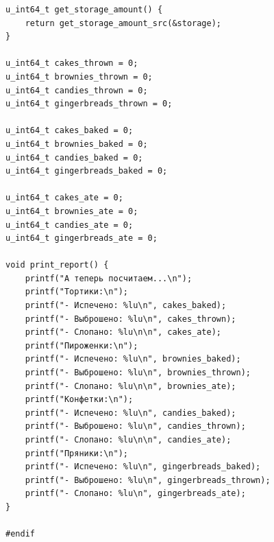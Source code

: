 \documentclass[a4paper,14pt]{extarticle}
\begin{document}
\begin{verbatim}
u_int64_t get_storage_amount() {
    return get_storage_amount_src(&storage);
}

u_int64_t cakes_thrown = 0;
u_int64_t brownies_thrown = 0;
u_int64_t candies_thrown = 0;
u_int64_t gingerbreads_thrown = 0;

u_int64_t cakes_baked = 0;
u_int64_t brownies_baked = 0;
u_int64_t candies_baked = 0;
u_int64_t gingerbreads_baked = 0;

u_int64_t cakes_ate = 0;
u_int64_t brownies_ate = 0;
u_int64_t candies_ate = 0;
u_int64_t gingerbreads_ate = 0;

void print_report() {
    printf("А теперь посчитаем...\n");
    printf("Тортики:\n");
    printf("- Испечено: %lu\n", cakes_baked);
    printf("- Выброшено: %lu\n", cakes_thrown);
    printf("- Слопано: %lu\n\n", cakes_ate);
    printf("Пироженки:\n");
    printf("- Испечено: %lu\n", brownies_baked);
    printf("- Выброшено: %lu\n", brownies_thrown);
    printf("- Слопано: %lu\n\n", brownies_ate);
    printf("Конфетки:\n");
    printf("- Испечено: %lu\n", candies_baked);
    printf("- Выброшено: %lu\n", candies_thrown);
    printf("- Слопано: %lu\n\n", candies_ate);
    printf("Пряники:\n");
    printf("- Испечено: %lu\n", gingerbreads_baked);
    printf("- Выброшено: %lu\n", gingerbreads_thrown);
    printf("- Слопано: %lu\n", gingerbreads_ate);
}

#endif
\end{verbatim}
\end{document}
